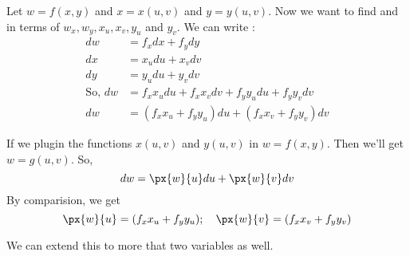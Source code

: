 Let $w = f(x, y)$ and $x = x(u, v)$ and $y = y(u, v)$.
Now we want to find  and  in terms of $w_x, w_y, x_u, x_v, y_u$ and $y_v$.
We can write :
\begin{align*}
dw & = f_x dx + f_y dy \\
dx & = x_u du + x_v dv \\
dy & = y_u du + y_v dv \\
\text{So, } dw & = f_x x_u du + f_x x_v dv + f_y y_u du + f_y y_v dv \\
dw & = (f_x x_u + f_y y_u) du + (f_x x_v + f_y y_v) dv
\end{align*}

If we plugin the functions $x(u, v)$ and $y(u, v)$ in $w = f(x, y)$.
Then we'll get $w = g(u, v)$. So, 
$$ dw = \px{w}{u} du + \px{w}{v} dv $$
By comparision, we get
$$
\px{w}{u} = (f_x x_u + f_y y_u) ; \quad 
\px{w}{v} = (f_x x_v + f_y y_v)
$$

We can extend this to more that two variables as well.
